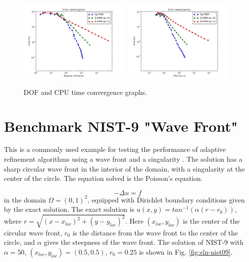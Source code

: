 \documentclass[12pt]{elsarticle}
\begin{document}
\begin{figure}[H]
\centering
\vspace{-3mm}
\includegraphics[height=4cm]{nist/nist-8/conv_dof_aniso.png}\ \
\includegraphics[height=4cm]{nist/nist-8/conv_cpu_aniso.png}
\vspace{-3mm}
\caption{DOF and CPU time convergence graphs.}
\label{fig:nist-8-conv}
\end{figure}


\section{Benchmark NIST-9 "Wave Front"}
\label{sec:bench-9}

This is a commonly used example for testing the performance of
adaptive refinement algorithms using a wave front and a singularity \cite{mitchell-1, mitchell-2}.
The solution has a sharp circular wave front in the interior of the
domain, with a singularity at the center of the circle.
The equation solved is the Poisson's equation.

\begin{equation} \label{wave-front}
-\Delta u = f
\end{equation}
in the domain $\Omega = (0, 1)^2$, equipped with Dirichlet boundary conditions
given by the exact solution. The exact solution is
$u(x, y) = tan^{-1}(\alpha (r - r_{0}))$,
where $r = \sqrt{(x - x_{loc})^{2} + (y - y_{loc})^{2}}$.
Here $(x_{loc}, y_{loc})$ is the center of the circular wave front,
$r_{0}$ is the distance from the wave front to the center of the circle,
and $\alpha$ gives the steepness of the wave front.
The solution of NIST-9 with $\alpha = 50$, $(x_{loc}, y_{loc}) = (0.5, 0.5)$,
$r_{0} = 0.25$ is shown in Fig. \ref{fig:sln-nist09}.
\end{document}
